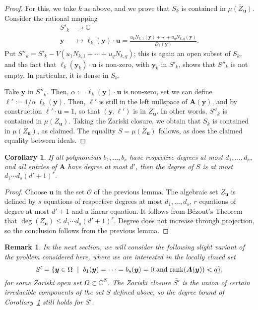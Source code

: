 \documentclass[12pt]{article}
\def\X{S}
\def\yb{{\bm y}}
\def\C{\mathbb{C}}
\newtheorem{corollary}[theorem]{Corollary}
\newtheorem{remark}[theorem]{Remark}
\begin{document}
\begin{proof}
  For this, we take $k$ as above, 
  and we prove that $\X_k$ is contained in $\overline{\mu(Z_{\bm u})}$.
  Consider the rational mapping 
  \begin{align*}
    \X'_k  &\rightarrow \C\\    
    \bm y &\mapsto  \bm \ell_k(\bm y)\cdot \bm u = \frac{ u_1 N_{k,1}(\bm y) + \cdots + u_q N_{k,q}(\bm y)}{D_k(\bm y)}.    
  \end{align*}
  Put $\X''_k = \X'_k - V(u_1 N_{k,1} + \cdots + u_q N_{k,q})$; this is
  again an open subset of $\X_k$, and the fact that $ \bm
  \ell_k(\bm y_k)\cdot \bm u$ is non-zero, with $\bm y_k$ in $\X'_k$, shows that
  $\X''_k$ is not empty. In particular, it is dense in $\X_k$.   

  Take $\bm y$ in $\X''_k$. Then, $\alpha:=\bm \ell_k(\bm y)\cdot \bm u$
  is non-zero, set we can define $\bm \ell' := 1/\alpha\ \bm\ell_k(\bm y)$.
  Then, $\bm \ell'$ is still in the left nullspace of $\bm A(\bm y)$,
  and by construction $ \bm \ell'\cdot \bm u =1$, so that $(\bm y, \bm
  \ell')$ is in $Z_{\bm u}$. In other words, $\X''_k$ is contained in
  $\mu(Z_{\bm u})$. Taking the Zariski closure, we obtain that $\X_k$ 
  is contained in $\overline{\mu(Z_{\bm u})}$, as claimed. 
  The equality $\X = \overline{\mu(Z_{\bm u})}$ follows, as does the
  claimed equality between ideals.
\end{proof}

\begin{corollary} \label{coro:degree}
  If all polynomials $b_1,\dots,b_s$ have respective degrees at most
  $d_1,\dots,d_s$, and all entries of $\bm A$ have degree at most
  $d'$, then the degree of $\X$ is at most $d_1 \cdots d_s (d'+1)^r.$
\end{corollary}
\begin{proof}
  Choose $\bm u$ in the set $\mathscr{O}$ of the previous lemma.  The
  algebraic set $Z_{\bm u}$ is defined by $s$ equations of respective
  degrees at most $d_1,\dots,d_s$, $r$ equations of degree at most
  $d'+1$ and a linear equation. It follows from B\'ezout's
  Theorem~\cite{H} that $\deg(Z_{\bm u}) \leq d_1 \cdots d_s
  (d'+1)^r$. Degree does not increase through projection, so the
  conclusion follows from the previous lemma.
\end{proof}

\begin{remark}\label{rk:degree}
  In the next section, we will consider the following slight variant
  of the problem considered here, where we are interested in the
  locally closed set
  \[\X' = \{\yb \in \Omega \ \mid \ b_1(\yb) = \cdots = b_s(\yb) =0 
  \text{~and~} {\rm rank}(\bm A(\yb)) < q\},\] for some Zariski open
  set $\Omega \subset \C^N$.  The Zariski closure $\overline{\X'}$ is
  the union of certain irreducible components of the set $\X$ defined
  above, so the degree bound of Corollary~\ref{coro:degree} still
  holds for $\overline{\X'}$.
\end{remark}
\end{document}
